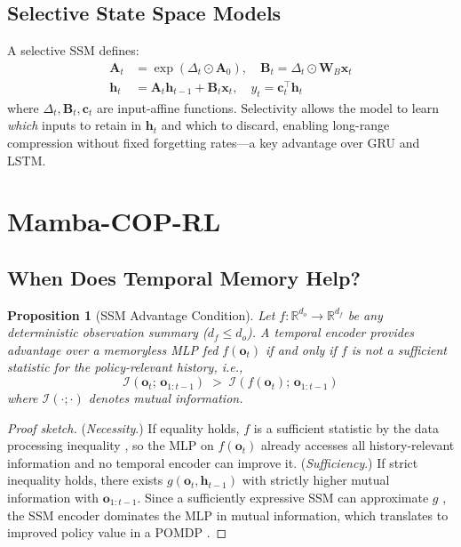 \documentclass[journal]{IEEEtran}
\def\mat#1{\mathbf{#1}}
\def\vec#1{\mathbf{#1}}
\newtheorem{proposition}{Proposition}
\begin{document}
\subsection{Selective State Space Models}

A selective SSM \cite{gu2023mamba} defines:
\begin{align}
  \mat{A}_t &= \exp(\Delta_t \odot \mat{A}_0),\quad
  \mat{B}_t = \Delta_t \odot \mat{W}_B \vec{x}_t \\
  \vec{h}_t &= \mat{A}_t \vec{h}_{t-1} + \mat{B}_t \vec{x}_t,\quad
  y_t       = \vec{c}_t^\top \vec{h}_t
  \label{eq:ssm}
\end{align}
where $\Delta_t, \mat{B}_t, \vec{c}_t$ are input-affine functions.
Selectivity allows the model to learn \emph{which} inputs to retain
in $\vec{h}_t$ and which to discard, enabling long-range compression
without fixed forgetting rates---a key advantage over GRU and LSTM.



\section{Mamba-COP-RL}
\label{sec:method}

\subsection{When Does Temporal Memory Help?}

\begin{proposition}[SSM Advantage Condition]
\label{prop:ssm_advantage}
Let $f: \mathbb{R}^{d_o} \to \mathbb{R}^{d_f}$ be any deterministic
observation summary ($d_f \leq d_o$).
A temporal encoder provides advantage over a memoryless MLP fed
$f(\vec{o}_t)$ if and only if $f$ is \emph{not} a sufficient
statistic for the policy-relevant history, i.e.,
\begin{equation}
  \mathcal{I}(\vec{o}_t;\, \vec{o}_{1:t-1}) \;>\;
  \mathcal{I}(f(\vec{o}_t);\, \vec{o}_{1:t-1})
  \label{eq:prop}
\end{equation}
where $\mathcal{I}(\cdot;\cdot)$ denotes mutual information.
\end{proposition}

\begin{proof}[Proof sketch]
(\emph{Necessity}.) If equality holds, $f$ is a sufficient statistic
by the data processing inequality \cite{cover2006elements}, so the MLP
on $f(\vec{o}_t)$ already accesses all history-relevant information and
no temporal encoder can improve it.
(\emph{Sufficiency}.) If strict inequality holds, there exists $g(\vec{o}_t,
\vec{h}_{t-1})$ with strictly higher mutual information with
$\vec{o}_{1:t-1}$.
Since a sufficiently expressive SSM can approximate $g$
\cite{schafer2007recurrent}, the SSM encoder dominates the MLP in mutual
information, which translates to improved policy value in a POMDP
\cite{kaelbling1998planning}.
\end{proof}
\end{document}
